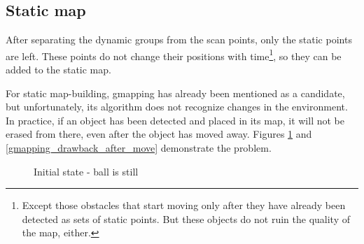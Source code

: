 \subsection{Static map}
\label{chap:static_map}
After separating the dynamic groups from the scan points, only the static points are left. These points do not change their positions with time\footnote{Except those obstacles that start moving only after they have already been detected as sets of static points. But these objects do not ruin the quality of the map, either.}, so they can be added to the static map.

For static map-building, gmapping has already been mentioned as a candidate, but unfortunately, its algorithm does not recognize changes in the environment. In practice, if an object has been detected and placed in its map, it will not be erased from there, even after the object has moved away. Figures \ref{gmapping_drawback_before_move} and \ref{gmapping_drawback_after_move} demonstrate the problem.

\begin{figure}[!ht]
    \centering
    \caption{Initial state - ball is still}
    \label{gmapping_drawback_before_move}
\end{figure}

